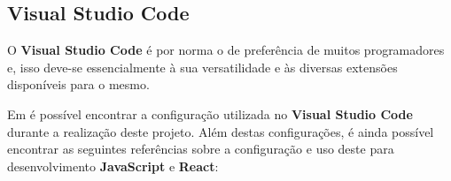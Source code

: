 \subsection{Visual Studio Code}

\begin{minipage}{.3\textwidth}
\end{minipage}
\begin{minipage}{.7\textwidth}
	\minipagerestore
	O \textbf{Visual Studio Code} é por norma o  de preferência de muitos programadores e, isso deve-se essencialmente à sua versatilidade e às diversas extensões disponíveis para o mesmo.
	
	Em  é possível encontrar a configuração utilizada no \textbf{Visual Studio Code} durante a realização deste projeto. Além destas configurações, é ainda possível encontrar as seguintes referências sobre a configuração e uso deste  para desenvolvimento \textbf{JavaScript} e \textbf{React}: \cite{ultimateVSReact,reactToolsVS,spVSExtensions,vscodeReactSP}
\end{minipage}